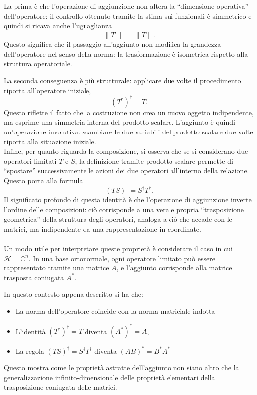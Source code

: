 \documentclass[a4paper,12pt]{report}
\begin{document}
La prima è che l’operazione di aggiunzione non altera la “dimensione operativa” dell’operatore: il controllo ottenuto tramite la stima sui funzionali è simmetrico e quindi si ricava anche l’uguaglianza
\[
\|T^\dagger\| = \|T\|.
\]
Questo significa che il passaggio all’aggiunto non modifica la grandezza dell’operatore nel senso della norma: la trasformazione è isometrica rispetto alla struttura operatoriale.

La seconda conseguenza è più strutturale: applicare due volte il procedimento riporta all’operatore iniziale,
\[
(T^\dagger)^\dagger = T.
\]
Questo riflette il fatto che la costruzione non crea un nuovo oggetto indipendente, ma esprime una simmetria interna del prodotto scalare. L’aggiunto è quindi un’operazione involutiva: scambiare le due variabili del prodotto scalare due volte riporta alla situazione iniziale.
\\Infine, per quanto riguarda la composizione, si osserva che se si considerano due operatori limitati $T$ e $S$, la definizione tramite prodotto scalare permette di “spostare” successivamente le azioni dei due operatori all’interno della relazione. Questo porta alla formula
\[
(TS)^\dagger = S^\dagger T^\dagger.
\]
Il significato profondo di questa identità è che l’operazione di aggiunzione inverte l’ordine delle composizioni: ciò corrisponde a una vera e propria “trasposizione geometrica” della struttura degli operatori, analoga a ciò che accade con le matrici, ma indipendente da una rappresentazione in coordinate.
\\
\\Un modo utile per interpretare queste proprietà è considerare il caso in cui $\mathscr{H} = \mathbb{C}^n$. In una base ortonormale, ogni operatore limitato può essere rappresentato tramite una matrice $A$, e l’aggiunto corrisponde alla matrice trasposta coniugata $A^*$.

\newpage
In questo contesto appena descritto si ha che:
\begin{itemize}
\item La norma dell’operatore coincide con la norma matriciale indotta
\item L’identità $(T^\dagger)^\dagger = T$ diventa $(A^*)^* = A$,
\item La regola $(TS)^\dagger = S^\dagger T^\dagger$ diventa $(AB)^* = B^* A^*$.
\end{itemize}
Questo mostra come le proprietà astratte dell’aggiunto non siano altro che la generalizzazione infinito-dimensionale delle proprietà elementari della trasposizione coniugata delle matrici.
\end{document}
